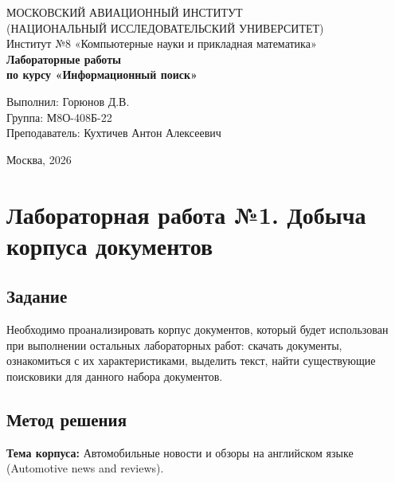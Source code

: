 \documentclass[a4paper,12pt]{article}
\begin{document}
\begin{titlepage}
    \centering
    {\fontsize{14pt}{16pt}\selectfont МОСКОВСКИЙ АВИАЦИОННЫЙ ИНСТИТУТ\\(НАЦИОНАЛЬНЫЙ ИССЛЕДОВАТЕЛЬСКИЙ УНИВЕРСИТЕТ)}\\[0.5cm]
    {\fontsize{12pt}{14pt}\selectfont Институт №8 «Компьютерные науки и прикладная математика»}\\[4cm]
    
    {\fontsize{16pt}{18pt}\selectfont \textbf{Лабораторные работы}}\\
    {\fontsize{14pt}{16pt}\selectfont \textbf{по курсу «Информационный поиск»}}\\[5cm]
    
    \vfill
    \begin{flushright}
        \begin{minipage}{0.51\textwidth}
            Выполнил: Горюнов Д.В. \\
            Группа: М8О-408Б-22\\
            Преподаватель: Кухтичев Антон Алексеевич
        \end{minipage}
    \end{flushright}
    
    \vfill
    {\large Москва, 2026}
\end{titlepage}

\tableofcontents
\newpage

\section{Лабораторная работа №1. Добыча корпуса документов}

\subsection{Задание}
Необходимо проанализировать корпус документов, который будет использован при выполнении 
остальных лабораторных работ: скачать документы, ознакомиться с их характеристиками, 
выделить текст, найти существующие поисковики для данного набора документов.

\subsection{Метод решения}

\textbf{Тема корпуса:} Автомобильные новости и обзоры на английском языке (Automotive news and reviews).
\end{document}
